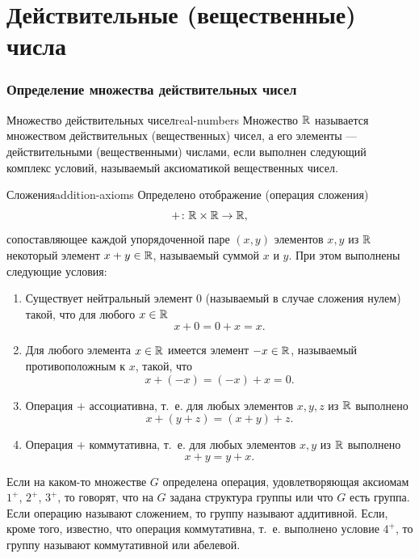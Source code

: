 \chapter{Действительные (вещественные) числа}


\subsection{Определение множества действительных чисел}

\begin{definition}{Множество действительных чисел}{real-numbers}
  Множество $\mathbb{R}$ называется множеством действительных (вещественных) чисел,
  а его элементы — действительными (вещественными) числами, если выполнен
  следующий комплекс условий, называемый аксиоматикой вещественных чисел.
\end{definition}

\begin{axiom}{Сложения}{addition-axioms}
  Определено отображение (операция сложения)
  \[
    +\colon \mathbb{R}\times\mathbb{R}\to\mathbb{R},
  \]
  сопоставляющее каждой упорядоченной паре $(x,y)$ элементов $x,y$ из $\mathbb{R}$
  некоторый элемент $x+y\in\mathbb{R}$, называемый суммой $x$ и $y$. При этом
  выполнены следующие условия:
  \begin{enumerate}[label=\arabic*${}^{+}$.]
    \item Существует нейтральный элемент $0$ (называемый в случае сложения
      нулем) такой, что для любого $x\in\mathbb{R}$
      \[
        x+0=0+x=x.
      \]\par
    \item Для любого элемента $x\in\mathbb{R}$ имеется элемент $-x\in\mathbb{R}$,
      называемый противоположным к $x$, такой, что
      \[
        x+(-x)=(-x)+x=0.
      \]\par
    \item Операция $+$ ассоциативна, т.~е. для любых элементов $x,y,z$ из
      $\mathbb{R}$ выполнено
      \[
        x+(y+z)=(x+y)+z.
      \]\par
    \item Операция $+$ коммутативна, т.~е. для любых элементов $x,y$ из
      $\mathbb{R}$ выполнено
      \[
        x+y=y+x.
      \]
  \end{enumerate}

  Если на каком-то множестве $G$ определена операция, удовлетворяющая
  аксиомам $1^{+}$, $2^{+}$, $3^{+}$, то говорят, что на $G$ задана структура
  группы или что $G$ есть группа. Если операцию называют сложением, то
  группу называют аддитивной. Если, кроме того, известно, что операция
  коммутативна, т.~е. выполнено условие $4^{+}$, то группу называют
  коммутативной или абелевой.
\end{axiom}

